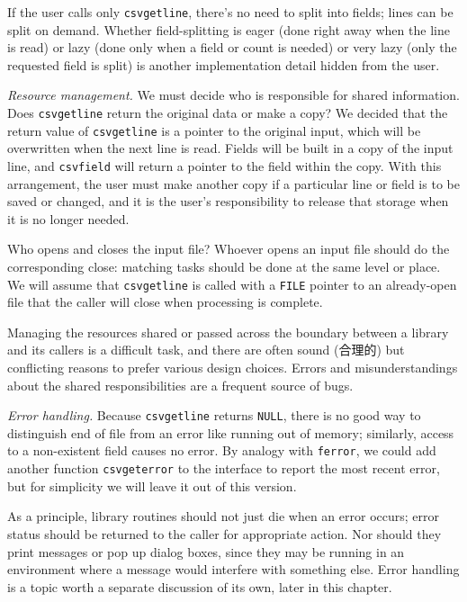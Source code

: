 If the user calls only \verb'csvgetline', there's no need to split into
fields; lines can be split on demand. Whether field-splitting is eager
(done right away when the line is read) or lazy (done only when a field or
count is needed) or very lazy (only the requested field is split) is
another implementation detail hidden from the user.

\emph{Resource management.} We must decide who is responsible for shared
information.  Does \verb'csvgetline' return the original data or make a
copy? We decided that the return value of \verb'csvgetline' is a pointer to
the original input, which will be overwritten when the next line is read.
Fields will be built in a copy of the input line, and \verb'csvfield' will
return a pointer to the field within the copy. With this arrangement, the
user must make another copy if a particular line or field is to be saved or
changed, and it is the user's responsibility to release that storage when
it is no longer needed.

Who opens and closes the input file? Whoever opens an input file should do
the corresponding close: matching tasks should be done at the same level or
place. We will assume that \verb'csvgetline' is called with a \verb'FILE'
pointer to an already-open file that the caller will close when processing
is complete.

Managing the resources shared or passed across the boundary between a
library and its callers is a difficult task, and there are often sound
(合理的) but conflicting reasons to prefer various design choices. Errors
and misunderstandings about the shared responsibilities are a frequent
source of bugs.

\emph{Error handling.} Because \verb'csvgetline' returns \verb'NULL', there
is no good way to distinguish end of file from an error like running out of
memory; similarly, access to a non-existent field causes no error. By
analogy with \verb'ferror', we could add another function
\verb'csvgeterror' to the interface to report the most recent error, but
for simplicity we will leave it out of this version.

As a principle, library routines should not just die when an error occurs;
error status should be returned to the caller for appropriate action. Nor
should they print messages or pop up dialog boxes, since they may be
running in an environment where a message would interfere with something
else. Error handling is a topic worth a separate discussion of its own,
later in this chapter.

